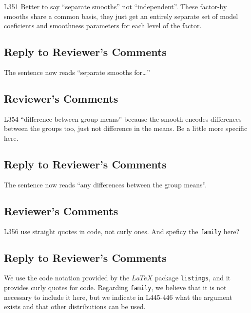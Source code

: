 \documentclass[
]{article}
\newcommand{\passthrough}[1]{#1}
\begin{document}
L351 Better to say ``separate smooths'' not ``independent''. These factor-by smooths share a common basis, they just get an entirely separate set of model coeficients and smoothness parameters for each level of the factor.

\hypertarget{section-25}{%
\subsection{\texorpdfstring{\textcolor{reviewersblue} {Reply to Reviewer's Comments}}{}}\label{section-25}}

The sentence now reads ``separate smooths for\ldots{}''

\hypertarget{reviewers-comments-25}{%
\subsection{Reviewer's Comments}\label{reviewers-comments-25}}

L354 ``difference between group means'' because the smooth encodes differences between the groups too, just not difference in the means. Be a little more specific here.

\hypertarget{section-26}{%
\subsection{\texorpdfstring{\textcolor{reviewersblue} {Reply to Reviewer's Comments}}{}}\label{section-26}}

The sentence now reads ``any differences between the group means''.

\hypertarget{reviewers-comments-26}{%
\subsection{Reviewer's Comments}\label{reviewers-comments-26}}

L356 use straight quotes in code, not curly ones. And speficy the \passthrough{\lstinline!family!} here?

\hypertarget{section-27}{%
\subsection{\texorpdfstring{\textcolor{reviewersblue} {Reply to Reviewer's Comments}}{}}\label{section-27}}

We use the code notation provided by the \(LaTeX\) package \passthrough{\lstinline!listings!}, and it provides curly quotes for code. Regarding \passthrough{\lstinline!family!}, we believe that it is not necessary to include it here, but we indicate in L445-446 what the argument exists and that other distributions can be used.
\end{document}
